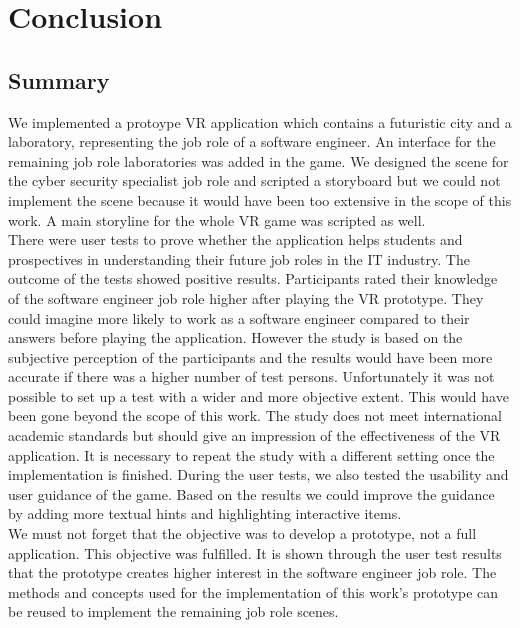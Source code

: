 \chapter{Conclusion} \label{conclusion}
\section{Summary}
We implemented a protoype VR application which contains a futuristic city and a laboratory, representing the job role of a software engineer. An interface for the remaining job role laboratories was added in the game. We designed the scene for the cyber security specialist job role and scripted a storyboard but we could not implement the scene because it would have been too extensive in the scope of this work. A main storyline for the whole VR game was scripted as well.\\
There were user tests to prove whether the application helps students and prospectives in understanding their future job roles in the IT industry. The outcome of the tests showed positive results. Participants rated their knowledge of the software engineer job role higher after playing the VR prototype. They could imagine more likely to work as a software engineer compared to their answers before playing the application. However the study is based on the subjective perception of the participants and the results would have been more accurate if there was a higher number of test persons. Unfortunately it was not possible to set up a test with a wider and more objective extent. This would have been gone beyond the scope of this work. The study does not meet international academic standards but should give an impression of the effectiveness of the VR application. It is necessary to repeat the study with a different setting once the implementation is finished. During the user tests, we also tested the usability and user guidance of the game. Based on the results we could improve the guidance by adding more textual hints and highlighting interactive items.\\
We must not forget that the objective was to develop a prototype, not a full application. This objective was fulfilled. It is shown through the user test results that the prototype creates higher interest in the software engineer job role. The methods and concepts used for the implementation of this work's prototype can be reused to implement the remaining job role scenes. 

